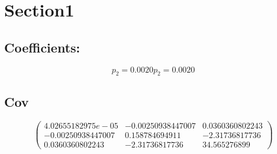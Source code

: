 \documentclass{article}\usepackage[T1]{fontenc}
\begin{document}
\section{Section1}
\subsection{Coefficients:}
$$p_2 = 0.0020 p_2 = 0.0020$$

\subsection{Cov}
$$\begin{pmatrix}
4.02655182975e-05&-0.00250938447007&0.0360360802243\\
-0.00250938447007&0.158784694911&-2.31736817736\\
0.0360360802243&-2.31736817736&34.565276899
\end{pmatrix}$$
\end{document}
